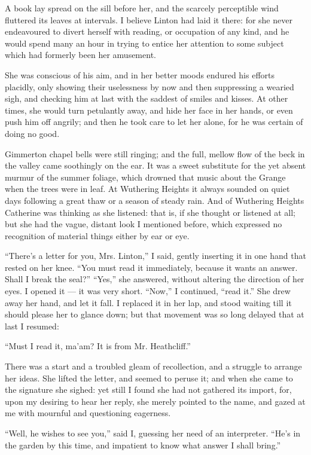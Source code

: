 \par A book lay spread on the sill before her, and the scarcely perceptible wind fluttered its leaves at intervals. I believe Linton had laid it there: for she never endeavoured to divert herself with reading, or occupation of any kind, and he would spend many an hour in trying to entice her attention to some subject which had formerly been her amusement.
\par She was conscious of his aim, and in her better moods endured his efforts placidly, only showing their uselessness by now and then suppressing a wearied sigh, and checking him at last with the saddest of smiles and kisses. At other times, she would turn petulantly away, and hide her face in her hands, or even push him off angrily; and then he took care to let her alone, for he was certain of doing no good.
\par Gimmerton chapel bells were still ringing; and the full, mellow flow of the beck in the valley came soothingly on the ear. It was a sweet substitute for the yet absent murmur of the summer foliage, which drowned that music about the Grange when the trees were in leaf. At Wuthering Heights it always sounded on quiet days following a great thaw or a season of steady rain. And of Wuthering Heights Catherine was thinking as she listened: that is, if she thought or listened at all; but she had the vague, distant look I mentioned before, which expressed no recognition of material things either by ear or eye.
\par “There's a letter for you, Mrs. Linton,” I said, gently inserting it in one hand that rested on her knee. “You must read it immediately, because it wants an answer. Shall I break the seal?” “Yes,” she answered, without altering the direction of her eyes. I opened it — it was very short. “Now,” I continued, “read it.” She drew away her hand, and let it fall. I replaced it in her lap, and stood waiting till it should please her to glance down; but that movement was so long delayed that at last I resumed:
\par “Must I read it, ma'am? It is from Mr. Heathcliff.”
\par There was a start and a troubled gleam of recollection, and a struggle to arrange her ideas. She lifted the letter, and seemed to peruse it; and when she came to the signature she sighed: yet still I found she had not gathered its import, for, upon my desiring to hear her reply, she merely pointed to the name, and gazed at me with mournful and questioning eagerness.
\par “Well, he wishes to see you,” said I, guessing her need of an interpreter. “He's in the garden by this time, and impatient to know what answer I shall bring.”
